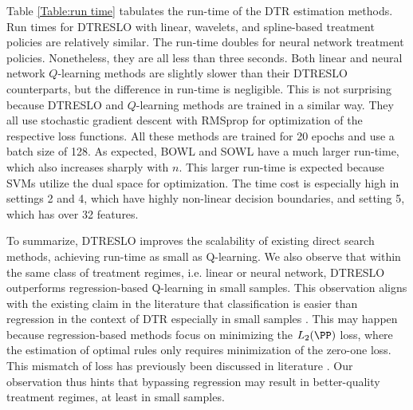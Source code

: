 \documentclass[preprint] {imsart}
\begin{document}
 Table \ref{Table:run time} tabulates the run-time of the DTR estimation methods. Run times for DTRESLO with linear, wavelets, and spline-based treatment policies are relatively similar. The run-time doubles for neural network treatment policies. Nonetheless, they are all less than three seconds. Both linear and neural network $Q$-learning methods  are slightly slower than their DTRESLO counterparts, but the difference in run-time is negligible. This is not surprising because DTRESLO and $Q$-learning methods are trained in a similar way. They all use stochastic gradient descent with RMSprop for optimization of the respective loss functions. All these methods are trained for 20 epochs and use a batch size of 128.   As expected, BOWL and SOWL  have a much larger run-time, which also increases sharply with $n$. This larger run-time is expected because SVMs utilize the dual space for optimization. The time cost is especially high in settings 2 and 4, which have highly non-linear decision boundaries, and setting 5, which has over 32 features.
 
 

To summarize, DTRESLO improves the scalability of existing direct search methods, achieving run-time as small as  Q-learning.
We also observe that within the same class of treatment regimes, i.e. linear or neural network, DTRESLO  outperforms regression-based Q-learning in small samples.  This observation aligns with the existing claim in the literature that  classification is easier than  regression in the context of DTR especially in small samples  \citep{zhao2015, laber2019}. This may happen because regression-based methods focus on minimizing the $L_2(\PP)$ loss, where  the estimation of optimal rules only requires minimization of the zero-one loss. This mismatch of loss has previously been discussed in literature \citep{murphy2005,qian2011}. Our observation thus hints that bypassing regression may result in  better-quality treatment regimes, at least in small samples. 







\end{document}
